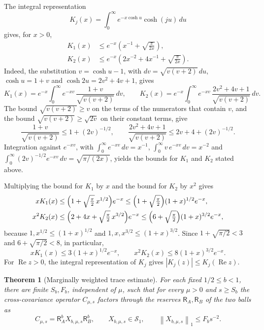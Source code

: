 \documentclass[11pt]{amsart}
\numberwithin{equation}{section}
\newtheorem{theorem}{Theorem}[section]
\theoremstyle{definition}
\newcommand{\Sc}{\mathcal S}
\newcommand{\Res}{\mathsf R}
\newcommand{\Rea}{\operatorname{Re}}
\newcommand{\norm}[1]{\left\|#1\right\|}
\begin{document}
The integral representation \cite[Eq.~10.32.9]{DLMF}
\[
 K_j(x)=\int_0^\infty e^{-x\cosh u}\cosh(ju)\,du
\]
gives, for \(x>0\),
\[
 \begin{split}
 K_1(x)&\le e^{-x}
 \left(x^{-1}+\sqrt{\frac{\pi}{2x}}\right),\\
 K_2(x)&\le e^{-x}
 \left(2x^{-2}+4x^{-1}+\sqrt{\frac{\pi}{2x}}\right).
 \end{split}
\]
Indeed, the substitution \(v=\cosh u-1\), with
\(dv=\sqrt{v(v+2)}\,du\), \(\cosh u=1+v\) and \(\cosh2u=2v^2+4v+1\),
gives
\[
 K_1(x)=e^{-x}\int_0^\infty e^{-xv}\,\frac{1+v}{\sqrt{v(v+2)}}\,dv,
 \qquad
 K_2(x)=e^{-x}\int_0^\infty e^{-xv}\,\frac{2v^2+4v+1}{\sqrt{v(v+2)}}\,dv.
\]
The bound \(\sqrt{v(v+2)}\ge v\) on the terms of the numerators that
contain \(v\), and the bound \(\sqrt{v(v+2)}\ge\sqrt{2v}\) on their
constant terms, give
\[
 \frac{1+v}{\sqrt{v(v+2)}}\le1+(2v)^{-1/2},
 \qquad
 \frac{2v^2+4v+1}{\sqrt{v(v+2)}}\le2v+4+(2v)^{-1/2}.
\]
Integration against \(e^{-xv}\), with
\(\int_0^\infty e^{-xv}\,dv=x^{-1}\),
\(\int_0^\infty v\,e^{-xv}\,dv=x^{-2}\) and
\(\int_0^\infty(2v)^{-1/2}e^{-xv}\,dv=\sqrt{\pi/(2x)}\), yields the
bounds for \(K_1\) and \(K_2\) stated above.

Multiplying the bound for \(K_1\) by \(x\) and the bound for \(K_2\) by
\(x^2\) gives
\[
 \begin{split}
 xK_1(x)&\le\Bigl(1+\sqrt{\tfrac\pi2}\,x^{1/2}\Bigr)e^{-x}
 \le\Bigl(1+\sqrt{\tfrac\pi2}\Bigr)(1+x)^{1/2}e^{-x},\\
 x^2K_2(x)&\le\Bigl(2+4x+\sqrt{\tfrac\pi2}\,x^{3/2}\Bigr)e^{-x}
 \le\Bigl(6+\sqrt{\tfrac\pi2}\Bigr)(1+x)^{3/2}e^{-x},
 \end{split}
\]
because \(1,x^{1/2}\le(1+x)^{1/2}\) and \(1,x,x^{3/2}\le(1+x)^{3/2}\).
Since \(1+\sqrt{\pi/2}<3\) and \(6+\sqrt{\pi/2}<8\), in particular,
\begin{equation}
 xK_1(x)\le3(1+x)^{1/2}e^{-x},\qquad
 x^2K_2(x)\le8(1+x)^{3/2}e^{-x}.
 \label{eq:Bessel-scaled}
\end{equation}
For \(\Rea z>0\), the integral representation of \(K_j\) gives
\(|K_j(z)|\le K_j(\Rea z)\).

\begin{theorem}[Marginally weighted trace estimate]\label{thm:forward}
For each fixed \(1/2\le b<1\), there are finite \(S_b,F_b\),
independent of \(\mu\), such that for every \(\mu>0\) and \(s\ge S_b\)
the cross-covariance operator \(C_{\mu,s}\) factors through the reserves
\(\Res_A,\Res_B\) of the two balls as
\begin{equation}
 C_{\mu,s}=\Res_A^bX_{b,\mu,s}\Res_B^b,\qquad
 X_{b,\mu,s}\in\Sc_1,\qquad
 \norm{X_{b,\mu,s}}_1\le F_bs^{-2}.
 \label{eq:forward-trace}
\end{equation}
\end{theorem}
\end{document}
